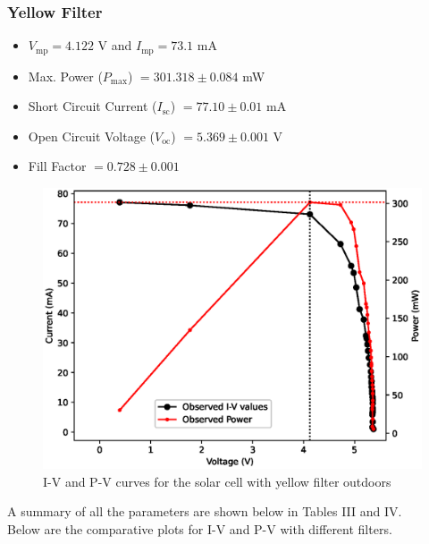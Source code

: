 \subsubsection{Yellow Filter}
\begin{itemize}
    \item $V_\text{mp} = 4.122$ V and $I_\text{mp} = 73.1$ mA
    \item Max. Power ($P_\text{max}$) $= 301.318 \pm 0.084 $ mW
    \item Short Circuit Current ($I_\text{sc}$) $= 77.10 \pm 0.01$ mA
    \item Open Circuit Voltage ($V_\text{oc}$) $= 5.369 \pm 0.001$ V
    \item Fill Factor $= 0.728 \pm 0.001$
\end{itemize}

\begin{figure}[H]
    \centering
    \includegraphics[width=1\columnwidth]{images/out/yellow.eps}
    \caption{I-V and P-V curves for the solar cell with yellow filter outdoors}
\end{figure}


A summary of all the parameters are shown below in Tables III and IV.\\




Below are the comparative plots for I-V and P-V with different filters.

